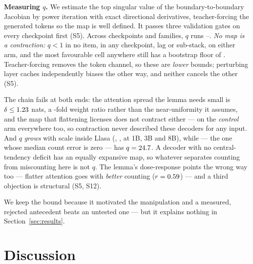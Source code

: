 \documentclass{article}
\begin{document}
\noindent\textbf{Measuring $q$.}
We estimate the top singular value of the boundary-to-boundary Jacobian by power
iteration with exact directional derivatives, teacher-forcing the generated
tokens so the map is well defined. It passes three validation gates on
every checkpoint first (S5). Across
\JacPanelN{} checkpoints and \JacPanelFam{} families, $q$ runs
\JacQMin{}--\JacQMax{}. \emph{No map is a contraction:} $q<1$ in no item, in any
checkpoint, lag or sub-stack, on either arm, and the most favourable cell
anywhere still has a bootstrap floor of \JacBestFloor{}. Teacher-forcing removes
the token channel, so these are \emph{lower} bounds; perturbing layer caches
independently biases the other way, and neither cancels the other (S5).

The chain fails at both ends: the attention spread the lemma needs small is
$\delta\le1.23{}$ nats, a \DeltaRatio{}-fold weight ratio rather than the
near-uniformity it assumes, and the map that flattening licenses does not
contract either --- on the \emph{control} arm everywhere too, so contraction
never described these decoders for any input. And $q$ \emph{grows} with scale inside Llasa (\JacQLlasaOne{},
\JacQLlasaThree{}, \JacQLlasaEight{} at 1B, 3B and 8B), while \ErrBestModel{}
--- the one whose median count error is zero --- has $q=24.7{}$. A
decoder with no central-tendency deficit has an equally expansive map, so
whatever separates counting from miscounting here is not $q$. The lemma's dose-response points the wrong way too --- flatter
attention goes with \emph{better} counting ($r=0.59{}$) --- and a third
objection is structural (S5, S12).

We keep the bound because it motivated the manipulation and a measured, rejected
antecedent beats an untested one --- but it explains nothing in
Section~\ref{sec:results}.

\section{Discussion}
\label{sec:discussion}



\vfill\pagebreak

\let\oldthebibliography\thebibliography
\renewcommand{\thebibliography}[1]{%
  \oldthebibliography{#1}%
  \setlength{\itemsep}{0pt}%
  \setlength{\parsep}{0pt}%
  \setlength{\parskip}{0pt}}


\end{document}
